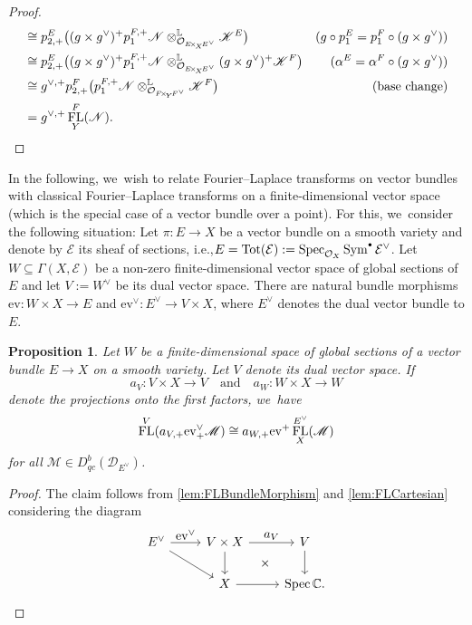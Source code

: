 \documentclass[11pt]{article}
\newcommand{\ie}{i.e.,\xspace}
\let\ts\textstyle
\newcommand{\sbullet}{{\scriptscriptstyle\bullet}}
\newcommand{\csbullet}{{\raisebox{1pt}{$\sbullet$}}}
\newcommand{\quand}{\quad\text{and}\quad}
\newcommand{\ev}{\mathrm{ev}}
\newtheorem{prop}[thm]{Proposition}
\DeclareMathOperator{\FL}{\textup{FL}}
\DeclareMathOperator{\Spec}{\textup{Spec}}
\DeclareMathOperator{\Sym}{\textup{Sym}}
\DeclareMathOperator{\Tot}{Tot}
\begin{document}
\begin{proof}
\begin{align*}
&\cong p_{2,+}^E \big((g \times g^\vee)^+ p_1^{F,+} \mathscr N \otimes^{\mathbb L}_{\O_{E\!\times_{\!X}\!E^\vee}} \mathscr K^E\big) &\text{\small ($g \circ p_1^E = p_1^F \circ (g \times g^\vee)$)} \\
&\cong p_{2,+}^E \big((g \times g^\vee)^+ p_1^{F,+} \mathscr N \otimes^{\mathbb L}_{\O_{E\!\times_{\!X}\!E^\vee}} (g \times g^\vee)^+\mathscr K^F\big) &\text{\small ($\alpha^E = \alpha^F \circ (g \times g^\vee)$)} \\
&\cong g^{\vee,+} p_{2,+}^F \big(p_1^{F,+} \mathscr N \otimes^{\mathbb L}_{\O_{F\!\times_{\!Y}\!F^\vee}} \mathscr K^F\big) &\text{\small (base change)} \\
&= g^{\vee,+} \FL_Y^F(\mathscr N). & \qedhere
\end{align*}
\end{proof}

In the following, we~wish to relate Fourier--Laplace transforms on
vector bundles with classical Fourier--Laplace transforms on a finite-dimensional vector space (which is the special case of a vector bundle over a point). For this, we~consider the following situation: Let $\pi \colon E \to X$ be a vector bundle on a smooth variety and denote by $\mathcal E$ its sheaf of sections, \ie $E = \Tot(\mathcal E) := \Spec_{\O_X} \Sym^{\csbullet} \mathcal E^\vee$. Let $W \subseteq \Gamma(X,\mathcal E)$ be a non-zero finite-dimensional vector space of global sections of $E$ and let $V := W^\vee$ be its dual vector space. There are natural bundle morphisms $\ev \colon W \times X \to E$ and $\ev^\vee \colon E^\vee \to V \times X$, where $E^\vee$ denotes the dual vector bundle to $E$.

\begin{prop} \label{prop:FLTransfer}
Let $W$ be a finite-dimensional space of global sections of a vector bundle $E \to X$ on a smooth variety. Let $V$ denote its dual vector space. If\vspace*{-3pt}
\[
a_V \colon V \times X \to V\quand a_W \colon W \times X \to W
\]
denote the projections onto the first factors, we~have\vspace*{-3pt}
\[
\FL^V(a_{V,+}\ev^\vee_+ \mathscr M) \cong a_{W,+} \ev^+ \FL_X^{E^\vee}(\mathscr M)
\]
for all $\mathscr M \in D_{qc}^b(\mathscr D_{E^\vee})$.
\end{prop}

\begin{proof}
The claim follows from \cref{lem:FLBundleMorphism} and \cref{lem:FLCartesian} considering the diagram\vspace*{-3pt}
\[
\begin{tikzcd}
E^\vee \ar{r}{\ts \ev^\vee} \ar{dr} & V \times X \ar{d} \ar{r}{\ts a_V} & V \ar{d} \\
& X \ar[phantom]{ur}{\times} \ar{r} & \Spec \C.
\end{tikzcd}\qedhere
\]
\end{proof}
\end{document}

